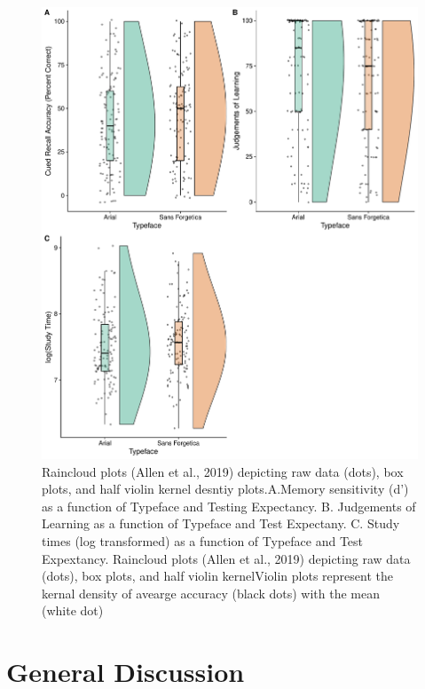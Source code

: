 \documentclass[
  english,
  man]{apa6}
\begin{document}
\begin{figure}

{\centering \includegraphics{Testing_Expectancy_SF_files/figure-latex/unnamed-chunk-20-1} 

}

\caption{Raincloud plots (Allen et al., 2019) depicting raw data (dots), box plots, and half violin kernel desntiy plots.A.Memory sensitivity (d') as a function of Typeface and Testing Expectancy. B. Judgements of Learning as a function of Typeface and Test Expectany. C. Study times (log transformed) as a function of Typeface and Test Expextancy. Raincloud plots (Allen et al., 2019) depicting raw data (dots), box plots, and half violin kernelViolin plots represent the kernal density of avearge accuracy (black dots) with the mean (white dot)}\label{fig:unnamed-chunk-20}
\end{figure}

\hypertarget{general-discussion}{%
\section{General Discussion}\label{general-discussion}}
\end{document}
